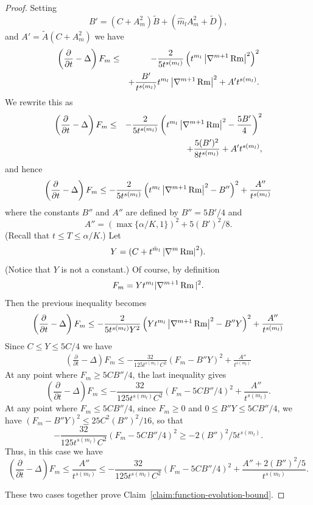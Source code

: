\begin{proof}
Setting
$$B'=(C+A_m^2)\widetilde B+(\hat m_lA_m^2+\widetilde D),$$
and $A'=\widetilde A(C+A_m^2)$ we have
\begin{eqnarray*}
\left(  \frac{\partial}{\partial t}-\Delta\right) F_m  & \leq &
-\frac{2}{5t^{s( m_l)  }
 }\left(t^{m_l}\left\vert\nabla^{m+1}\operatorname{Rm}\right\vert^2\right)^2 \\
 & & +
\frac{B'}{t^{s(m_l)}}t^{m_l}\left\vert\nabla^{m+1}\operatorname{Rm}\right\vert^2
+A't^{s(m_l)}.
\end{eqnarray*}
We rewrite this as
\begin{eqnarray*}
\left(  \frac{\partial}{\partial t}-\Delta\right) F_m & \leq &
-\frac{2}{5t^{s(m_l)}}\left(t^{m_l}\left\vert\nabla^{m+1}\operatorname{Rm}
\right\vert^2   -\frac{5B'}{4}\right)^2
\\ & & +\frac{5(B')^2}{8t^{s(m_l)}} +A't^{s(m_l)},
\end{eqnarray*}
and hence
\begin{equation*}
\left(  \frac{\partial}{\partial t}-\Delta\right) F_m \leq
-\frac{2}{5t^{s(m_l)}}\left(t^{m_l}\left\vert\nabla^{m+1}\operatorname{Rm}
\right\vert^2-B''\right)^2  +\frac{A''}{t^{s(m_l)}}
\end{equation*}
where the constants $B''$ and $A''$ are defined by $ B''=5 B'/4$ and
$$A''=(\max\{\alpha/K,1\})^2+5( B')^2/8.$$ (Recall that $t\le T\le
\alpha/K$.) Let
$$Y=(C+t^{\hat
m_l}\left\vert\nabla^m\operatorname{Rm}\right\vert^2).$$ (Notice
that $Y$ is not a constant.) Of course, by definition
$$F_m=Yt^{m_l}|\nabla^{m+1}\operatorname{Rm}|^2.$$ Then the previous inequality
becomes
\begin{equation*}
\left(\frac{\partial}{\partial t}-\Delta\right)  F_m \leq
-\frac{2}{5t^{s(m_l)}Y^2}\left(Yt^{m_l}\left\vert\nabla^{m+1}\operatorname{Rm}
\right\vert^2-B'' Y\right)^2
 +\frac{A''}{t^{s(m_l)}}
\end{equation*}
Since $C\le Y\le 5C/4$ we have
\begin{eqnarray*}
\left(  \frac{\partial}{\partial t}-\Delta\right)  F_m \leq
-\frac{32}{125t^{s(m_l)}C^2}\left(F_m-B''
Y\right)^2+\frac{A''}{t^{s(m_l)}}
\end{eqnarray*}
At any point where $F_m\ge 5CB''/4$,  the last inequality gives
$$\left(  \frac{\partial}{\partial t}-\Delta\right)  F_m \leq
-\frac{32}{125t^{s(m_l)}C^2}\left(F_m-5CB''/4\right)^2+\frac{A''}{t^{s(m_l)}}.$$
At any point where $F_m\le 5CB''/4$,  since $F_m\ge 0$ and $0\le
B''Y\le 5CB''/4$, we have $(F_m-B''Y)^2\le 25C^2(B'')^2/16$, so that
$$-\frac{32}{125t^{s(m_l)}C^2}\left(F_m-5CB''/4\right)^2\ge
-2(B'')^2/5t^{s(m_l)}.$$ Thus, in this case we have
$$\left(\frac{\partial}{\partial t}-\Delta\right)  F_m \leq
\frac{A''}{t^{s(m_l)}}\le
-\frac{32}{125t^{s(m_l)}C^2}\left(F_m-5CB''/4\right)^2+\frac{A''+2(B'')^2/5}{t^{s(m_l)}}.$$


These two cases together prove Claim~\ref{claim:function-evolution-bound}.
\end{proof}




